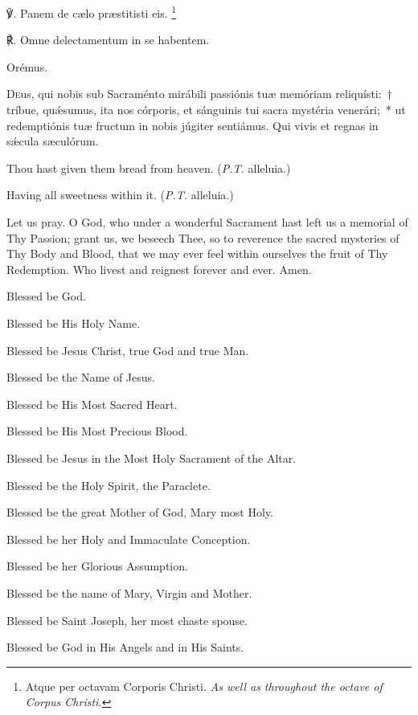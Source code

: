 \documentclass[11pt]{book}
\begin{document}
   \begin{paracol}{2}

\noindent ℣. Panem de cælo præstitisti eis. \tpalleluia{}\footnote{Atque per octavam Corporis Christi. \textit{As well as throughout the octave of Corpus Christi.}}

\noindent ℟. Omne delectamentum in se habentem. \tpalleluia{}

  Orémus.
  
  \lettrine{D}{e}us, qui nobis sub Sacraménto mirábili passiónis tuæ memóriam reliquísti:~† tríbue, quǽsumus, ita nos córporis, et sánguinis tui sacra mystéria venerári;~* ut redemptiónis tuæ fructum in nobis júgiter sentiámus. Qui vivis et regnas in sǽcula sæculórum. 

  \switchcolumn
\begin{otherlanguage}{english}
\noindent \vv Thou hast given them bread from heaven. (\textit{P.T.} alleluia.)

\noindent \rr Having all sweetness within it. (\textit{P.T.} alleluia.)

\noindent Let us pray. O God, who under a wonderful Sacrament hast left us a memorial of Thy Passion; grant us, we beseech Thee, so to reverence the sacred mysteries of Thy Body and Blood, that we may ever feel within ourselves the fruit of Thy Redemption. Who livest and reignest forever and ever. Amen.
\end{otherlanguage}\end{paracol}

\begin{multicols}{2}
\raggedcolumns
\begin{otherlanguage}{english}

Blessed be God. 

Blessed be His Holy Name. 

Blessed be Jesus Christ, true God and true Man.
 
Blessed be the Name of Jesus.

Blessed be His Most Sacred Heart.

Blessed be His Most Precious Blood.

Blessed be Jesus in the Most Holy Sacrament of the Altar.

Blessed be the Holy Spirit, the Paraclete.

Blessed be the great Mother of God, Mary most Holy.

Blessed be her Holy and Immaculate Conception.


Blessed be her Glorious Assumption.

Blessed be the name of Mary, Virgin and Mother.

Blessed be Saint Joseph, her most chaste spouse.

Blessed be God in His Angels and in His Saints.

\end{otherlanguage}
\end{multicols}
\end{document}
